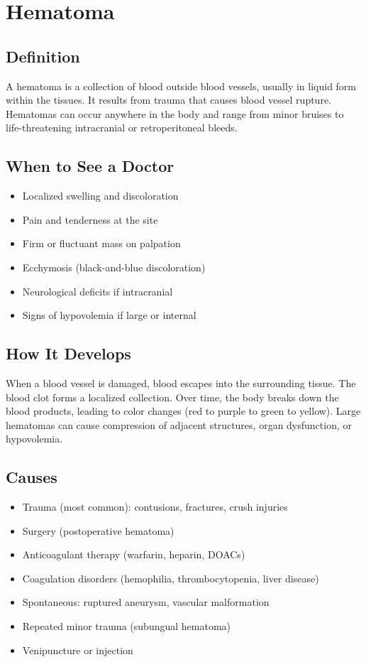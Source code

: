 \chapter{Hematoma}

\section*{Definition}
A hematoma is a collection of blood outside blood vessels, usually in liquid form within the tissues. It results from trauma that causes blood vessel rupture. Hematomas can occur anywhere in the body and range from minor bruises to life-threatening intracranial or retroperitoneal bleeds.

\section*{When to See a Doctor}
\begin{itemize}
\item Localized swelling and discoloration
\item Pain and tenderness at the site
\item Firm or fluctuant mass on palpation
\item Ecchymosis (black-and-blue discoloration)
\item Neurological deficits if intracranial
\item Signs of hypovolemia if large or internal
\end{itemize}

\section*{How It Develops}
When a blood vessel is damaged, blood escapes into the surrounding tissue. The blood clot forms a localized collection. Over time, the body breaks down the blood products, leading to color changes (red to purple to green to yellow). Large hematomas can cause compression of adjacent structures, organ dysfunction, or hypovolemia.

\section*{Causes}
\begin{itemize}
\item Trauma (most common): contusions, fractures, crush injuries
\item Surgery (postoperative hematoma)
\item Anticoagulant therapy (warfarin, heparin, DOACs)
\item Coagulation disorders (hemophilia, thrombocytopenia, liver disease)
\item Spontaneous: ruptured aneurysm, vascular malformation
\item Repeated minor trauma (subungual hematoma)
\item Venipuncture or injection
\end{itemize}

